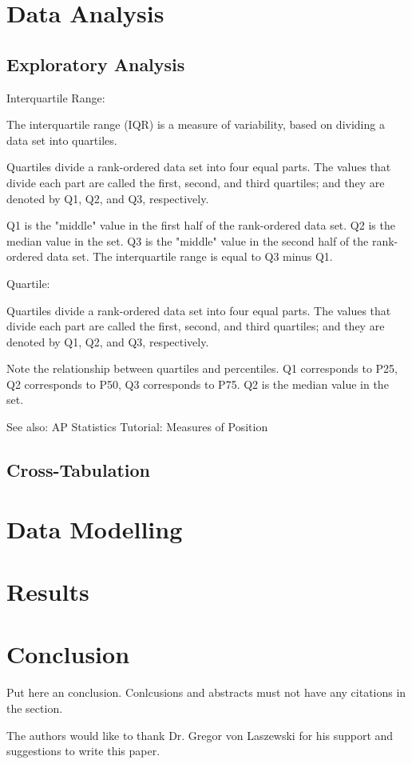 \documentclass[sigconf]{acmart}
\begin{document}
\section{Data Analysis}

\subsection{Exploratory Analysis}

Interquartile Range:

The interquartile range (IQR) is a measure of variability, based on dividing a data set into quartiles.

Quartiles divide a rank-ordered data set into four equal parts. The values that divide each part are called the first, second, and third quartiles; and they are denoted by Q1, Q2, and Q3, respectively.

Q1 is the "middle" value in the first half of the rank-ordered data set.
Q2 is the median value in the set.
Q3 is the "middle" value in the second half of the rank-ordered data set.
The interquartile range is equal to Q3 minus Q1.\cite{stat-trek-statistics}

Quartile:

Quartiles divide a rank-ordered data set into four equal parts. The values that divide each part are called the first, second, and third quartiles; and they are denoted by Q1, Q2, and Q3, respectively.

Note the relationship between quartiles and percentiles. Q1 corresponds to P25, Q2 corresponds to P50, Q3 corresponds to P75. Q2 is the median value in the set.

See also:  	AP Statistics Tutorial: Measures of Position



\subsection{Cross-Tabulation}

\section{Data Modelling}

\section{Results}



\section{Conclusion}

Put here an conclusion. Conlcusions and abstracts must not have any
citations in the section.


\begin{acks}

  The authors would like to thank Dr. Gregor von Laszewski for his
  support and suggestions to write this paper.

\end{acks}


 
\end{document}
